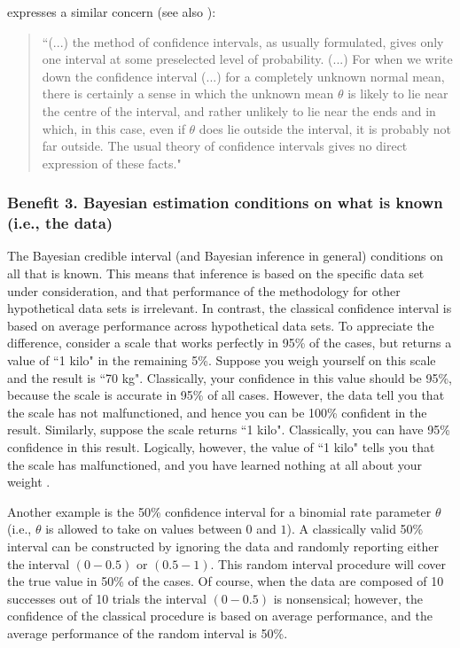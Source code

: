  expresses a similar concern (see also ):
\begin{quotation}
``(...) the method of confidence intervals, as usually formulated, gives only one interval at some preselected level of probability. (...) For when we write down the confidence interval (...) for a completely unknown normal mean, there is certainly a sense in which the unknown mean $\theta$ is likely to lie near the centre of the interval, and rather unlikely to lie near the ends and in which, in this case, even if $\theta$ does lie outside the interval, it is probably not far outside. The usual theory of confidence intervals gives no direct expression of these facts."
\end{quotation}

\subsubsection{Benefit 3. Bayesian estimation conditions on what is known (i.e., the data)}
The Bayesian credible interval (and Bayesian inference in general) conditions on all that is known. This means that inference is based on the specific data set under consideration, and that performance of the methodology for other hypothetical data sets is irrelevant. In contrast, the classical confidence interval is based on average performance across hypothetical data sets. To appreciate the difference, consider a scale that works perfectly in 95\% of the cases, but returns a value of ``1 kilo" in the remaining 5\%. Suppose you weigh yourself on this scale and the result is ``70 kg". Classically, your confidence in this value should be 95\%, because the scale is accurate in 95\% of all cases. However, the data tell you that the scale has not malfunctioned, and hence you can be 100\% confident in the result. Similarly, suppose the scale returns ``1 kilo". Classically, you can have 95\% confidence in this result. Logically, however, the value of ``1 kilo" tells you that the scale has malfunctioned, and you have learned nothing at all about your weight \cite{BergerWolpert1988}.

Another example is the 50\% confidence interval for a binomial rate parameter $\theta$ (i.e., $\theta$ is allowed to take on values between $0$ and $1$). A classically valid 50\% interval can be constructed by ignoring the data and randomly reporting either the interval $(0-0.5)$ or $(0.5-1)$. This random interval procedure will cover the true value in 50\% of the cases. Of course, when the data are composed of 10 successes out of 10 trials the interval $(0-0.5)$ is nonsensical; however, the confidence of the classical procedure is based on average performance, and the average performance of the random interval is 50\%.

